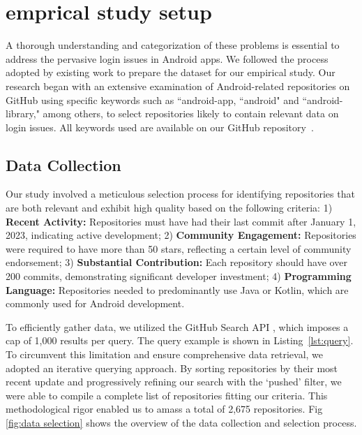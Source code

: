\section{emprical study setup}
A thorough understanding and categorization of these problems is essential to address the pervasive login issues in Android apps. We followed the process adopted by existing work \cite{8999997,chen2024demystifyingdevicespecificcompatibilityissues,10.1145/3597926.3598138,7582761} to prepare the dataset for our empirical study. Our research began with an extensive examination of Android-related repositories on GitHub \cite{github} using specific keywords such as ``android-app, ``android" and ``android-library," among others, to select repositories likely to contain relevant data on login issues. All keywords used are available on our GitHub repository~\cite{code}.

\subsection{Data Collection}

Our study involved a meticulous selection process for identifying repositories that are both relevant and exhibit high quality based on the following criteria:
1) \textbf{Recent Activity:} Repositories must have had their last commit after January 1, 2023, indicating active development;
2) \textbf{Community Engagement:} Repositories were required to have more than 50 stars, reflecting a certain level of community endorsement;
3) \textbf{Substantial Contribution:} Each repository should have over 200 commits, demonstrating significant developer investment;
4) \textbf{Programming Language:} Repositories needed to predominantly use Java or Kotlin, which are commonly used for Android development.

To efficiently gather data, we utilized the GitHub Search API \cite{githubsearch}, which imposes a cap of 1,000 results per query. The query example is shown in Listing~\ref{lst:query}. To circumvent this limitation and ensure comprehensive data retrieval, we adopted an iterative querying approach\cite{8595172,chen2024demystifyingdevicespecificcompatibilityissues,10148722}. By sorting repositories by their most recent update and progressively refining our search with the `pushed' filter, we were able to compile a complete list of repositories fitting our criteria. This methodological rigor enabled us to amass a total of 2,675 repositories. Fig \ref{fig:data selection} shows the overview of the data collection and selection process.  

